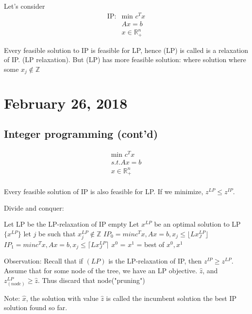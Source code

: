 \documentclass{article}
\theoremstyle{plain}
\theoremstyle{definition}
\newcommand{\floor}[1]{\lfloor #1 \rfloor}
\newcommand{\ceiling}[1]{\lceil #1 \rceil}
\begin{document}
Let's consider
\begin{align*}
    \text{IP:}&\text{min } c^Tx\\
    &Ax = b\\
    &x\in\mathbb{R}_+^{n}
\end{align*}

Every feasible solution to IP is feasible for LP, hence (LP) is called is a
relaxation of IP. (LP relaxation). But (LP) has more feasible solution: where
solution where some $x_j \not\in\mathbb{Z}$

\section{February 26, 2018}
\subsection{Integer programming (cont'd)}
\begin{align*}
    \text{min } c^Tx\\
    s.t. Ax = b\\
    x \in\mathbb{R}^n_+\\
\end{align*}

Every feasible solution of IP is also feasible for LP. If we minimize,
$z^{LP} \leq z^{IP}$.

Divide and conquer:
\begin{algorithmic}[1]
    \State Let LP be the LP-relaxation of IP
     \Return empty
    \EndIf
    \State Let $x^{LP}$ be an optimal solution to LP
     \Return $\{x^{LP}\}$
    \Else
    \State let $j$ be such that $x_j^{LP}\not\in\mathbb{Z}$
    \State $IP_0 = min c^Tx, Ax = b, x_j \leq \floor{Lx_J^{LP}}$
    \State $IP_1 = min c^Tx, Ax = b, x_j \leq \ceiling{Lx_J^{LP}}$
    \State $x^0$ = 
    \State $x^1$ = 
    \State \Return best of $x^0, x^1$
    \EndIf
\end{algorithmic}

Observation:
Recall that if $(LP)$ is the LP-relaxation of IP, then $z^{IP} \geq z^{LP}$.
Assume that for some node of the tree, we have an LP objective.
$\hat{z}$, and $z^{LP}_{(node)} \geq \hat{z}$. Thus discard that node("pruning")

Note: $\hat{x}$, the solution with value $\hat{z}$ is called the incumbent solution
the best IP solution found so far.
\end{document}
